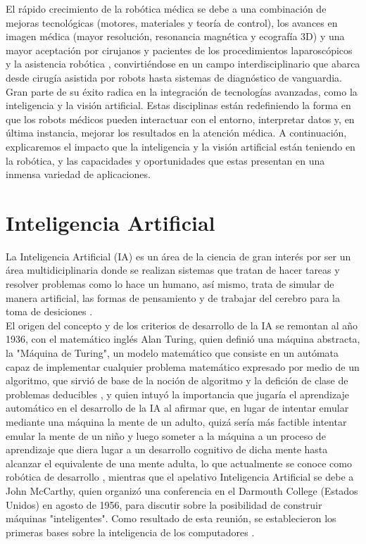 El rápido crecimiento de la robótica médica se debe a una combinación de mejoras tecnológicas (motores, materiales y teoría de control), los avances en imagen médica (mayor resolución, resonancia magnética y ecografía 3D) y una mayor aceptación por cirujanos y pacientes de los procedimientos laparoscópicos y la asistencia robótica \cite{Beasley12}, convirtiéndose en un campo interdisciplinario que abarca desde cirugía asistida por robots hasta sistemas de diagnóstico de vanguardia. Gran parte de su éxito radica en la integración de tecnologías avanzadas, como la inteligencia y la visión artificial. Estas disciplinas están redefiniendo la forma en que los robots médicos pueden interactuar con el entorno, interpretar datos y, en última instancia, mejorar los resultados en la atención médica. A continuación, explicaremos el impacto que la inteligencia y la visión artificial están teniendo en la robótica, y las capacidades y oportunidades que estas presentan en una inmensa variedad de aplicaciones.

\pagebreak

\section{Inteligencia Artificial}
\label{sec:IA} 

La Inteligencia Artificial (IA) es un área de la ciencia de gran interés por ser un área multidiciplinaria donde se realizan sistemas que tratan de hacer tareas y resolver problemas como lo hace un humano, así mismo, trata de simular de manera artificial, las formas de pensamiento y de trabajar del cerebro para la toma de desiciones \cite{Ponce14}.\\

El origen del concepto y de los criterios de desarrollo de la IA se remontan al año 1936, con el matemático inglés Alan Turing, quien definió una máquina abstracta, la "Máquina de Turing", un modelo matemático que consiste en un autómata capaz de implementar cualquier problema matemático expresado por medio de un algoritmo, que sirvió de base de la noción de algoritmo y la defición de clase de problemas deducibles \cite{Hardy01}, y quien intuyó la importancia que jugaría el aprendizaje automático en el desarrollo de la IA al afirmar que, en lugar de intentar emular mediante una máquina la mente de un adulto, quizá sería más factible intentar emular la mente de un niño y luego someter a la máquina a un proceso de aprendizaje que diera lugar a un desarrollo cognitivo de dicha mente hasta alcanzar el equivalente de una mente adulta, lo que actualmente se conoce como robótica de desarrollo \cite{Gonzalez17}, mientras que el apelativo Inteligencia Artificial se debe a John McCarthy, quien organizó una conferencia en el Darmouth College (Estados Unidos) en agosto de 1956, para discutir sobre la posibilidad de construir máquinas "inteligentes". Como resultado de esta reunión, se establecieron los primeras bases sobre la inteligencia de los computadores \cite{Ponce14}. \\

